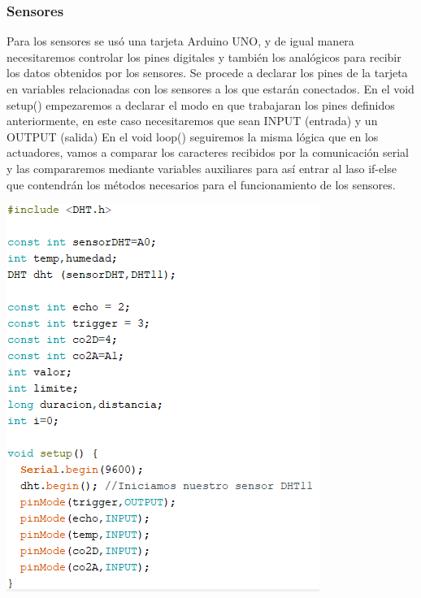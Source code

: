 \documentclass[12pt]{report}
\begin{document}
\subsubsection{Sensores}
Para los sensores se usó una tarjeta Arduino UNO,  y de igual manera necesitaremos controlar los pines digitales y también los analógicos para recibir los datos obtenidos por los sensores.
Se procede a declarar los pines de la tarjeta en variables relacionadas con los sensores a los que estarán conectados. 
En el void setup() empezaremos a declarar el modo en que trabajaran los pines definidos anteriormente, en este caso necesitaremos que sean INPUT (entrada) y un OUTPUT (salida)
En el void loop() seguiremos la misma lógica que en los actuadores, vamos a comparar los caracteres recibidos por la comunicación serial y las compararemos mediante variables auxiliares para así entrar al laso if-else que contendrán los métodos necesarios para el funcionamiento de los sensores.
\begin{center}
\includegraphics[scale=0.8]{Documento/Figuras/12.PNG}
\begin{scriptsize}
\\ 
\end{scriptsize}
\end{center}
\end{document}
